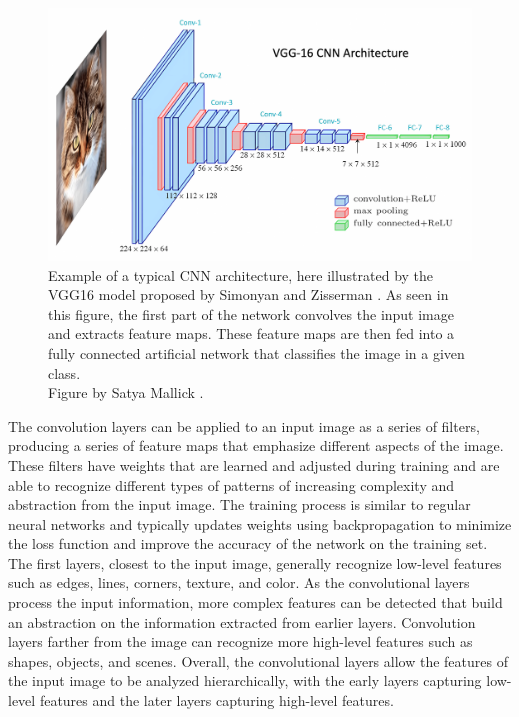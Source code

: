     \begin{figure}[htb]
        \centerline{
        \includegraphics[width=1.1\linewidth]{images/vgg_cnn.png}}
        \caption[Example of a CNN architecture, illustrated by the VGG16 model.]{Example of a typical CNN architecture, here illustrated by the VGG16 model proposed by Simonyan and Zisserman \cite{simonyanVeryDeepConvolutional2015}. As seen in this figure, the first part of the network convolves the input image and extracts feature maps. These feature maps are then fed into a fully connected artificial network that classifies the image in a given class.\\
        Figure by Satya Mallick \cite{UnderstandingConvolutionalNeural2023}.}
        \label{fig:vgg_cnn}
    \end{figure}
    
    The convolution layers can be applied to an input image as a series of filters, producing a series of feature maps that emphasize different aspects of the image. These filters have weights that are learned and adjusted during training and are able to recognize different types of patterns of increasing complexity and abstraction from the input image. The training process is similar to regular neural networks and typically updates weights using backpropagation to minimize the loss function and improve the accuracy of the network on the training set. The first layers, closest to the input image, generally recognize low-level features such as edges, lines, corners, texture, and color. As the convolutional layers process the input information, more complex features can be detected that build an abstraction on the information extracted from earlier layers. Convolution layers farther from the image can recognize more high-level features such as shapes, objects, and scenes. Overall, the convolutional layers allow the features of the input image to be analyzed hierarchically, with the early layers capturing low-level features and the later layers capturing high-level features.
    
